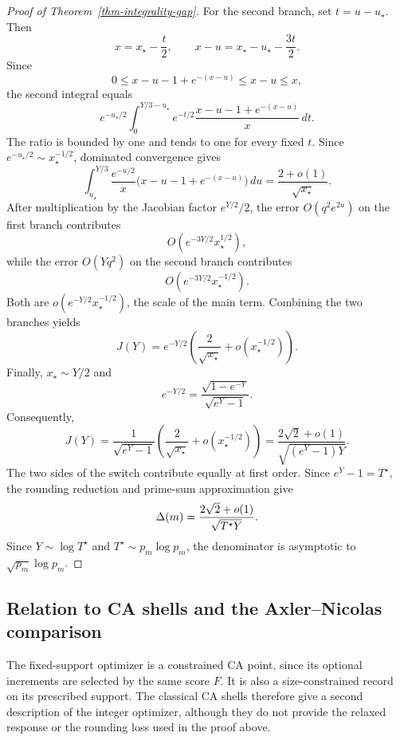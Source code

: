 \begin{proof}[Proof of Theorem~\ref{thm-integrality-gap}]
For the second branch, set \(t=u-u_\star\). Then
\[
    x=x_\star-\frac t2,
    \qquad
    x-u=x_\star-u_\star-\frac{3t}{2}.
\]
Since
\[
    0\leq x-u-1+e^{-(x-u)}\leq x-u\leq x,
\]
the second integral equals
\[
    e^{-u_\star/2}
    \int_0^{Y/3-u_\star}
    e^{-t/2}
    \frac{x-u-1+e^{-(x-u)}}x\,dt.
\]
The ratio is bounded by one and tends to one for every fixed \(t\).
Since \(e^{-u_\star/2}\sim x_\star^{-1/2}\), dominated convergence gives
\[
    \int_{u_\star}^{Y/3}
    \frac{e^{-u/2}}x
    \bigl(x-u-1+e^{-(x-u)}\bigr)\,du
    =
    \frac{2+o(1)}{\sqrt{x_\star}}.
\]
After multiplication by the Jacobian factor \(e^{Y/2}/2\), the error
\(O(q^2e^{2u})\) on the first branch contributes
\[
    O(e^{-3Y/2}x_\star^{1/2}),
\]
while the error \(O(Yq^2)\) on the second branch contributes
\[
    O(e^{-3Y/2}x_\star^{-1/2}).
\]
Both are \(o(e^{-Y/2}x_\star^{-1/2})\), the scale of the main term.
Combining the two branches yields
\[
    J(Y)
    =
    e^{-Y/2}
    \left(
        \frac2{\sqrt{x_\star}}
        +o(x_\star^{-1/2})
    \right).
\]
Finally, \(x_\star\sim Y/2\) and
\[
    e^{-Y/2}
    =
    \frac{\sqrt{1-e^{-Y}}}{\sqrt{e^Y-1}}.
\]
Consequently,
\[
    J(Y)
    =
    \frac1{\sqrt{e^Y-1}}
    \left(
        \frac2{\sqrt{x_\star}}
        +o(x_\star^{-1/2})
    \right)
    =
    \frac{2\sqrt2+o(1)}
         {\sqrt{(e^Y-1)Y}}.
\]
The two sides of the switch contribute equally at first order. Since
\(e^Y-1=T^\star\), the rounding reduction and prime-sum approximation
give
\[
    \Delta(m)
    =
    \frac{2\sqrt2+o(1)}
         {\sqrt{T^\star Y}}.
\]
Since \(Y\sim\log T^\star\) and
\(T^\star\sim p_m\log p_m\), the denominator is asymptotic to
\(\sqrt{p_m}\log p_m\).
\end{proof}

\subsection{Relation to CA shells and the Axler--Nicolas comparison}
\label{s-score-connection}

The fixed-support optimizer is a constrained CA point, since its
optional increments are selected by the same score \(F\). It is also a
size-constrained record on its prescribed support. The classical CA shells
therefore give a second description of the integer optimizer, although
they do not provide the relaxed response or the rounding loss used in the
proof above.

